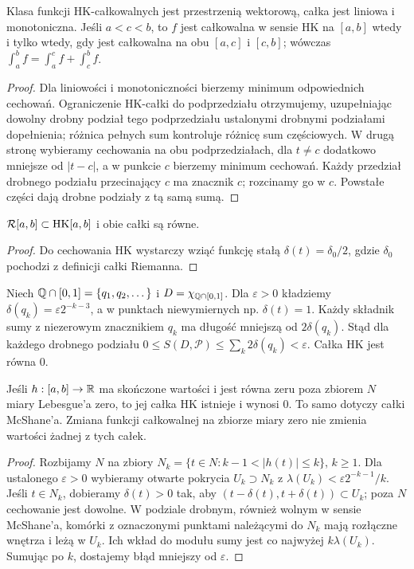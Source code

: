 \begin{twierdzenie}
Klasa funkcji HK-całkowalnych jest przestrzenią wektorową, całka jest liniowa i monotoniczna. Jeśli $a<c<b$, to $f$ jest całkowalna w sensie HK na $[a,b]$ wtedy i tylko wtedy, gdy jest całkowalna na obu $[a,c]$ i $[c,b]$; wówczas $\int_a^b f=\int_a^c f+\int_c^b f$.
\end{twierdzenie}
\begin{proof}
Dla liniowości i monotoniczności bierzemy minimum odpowiednich cechowań. Ograniczenie HK-całki do podprzedziału otrzymujemy, uzupełniając dowolny drobny podział tego podprzedziału ustalonymi drobnymi podziałami dopełnienia; różnica pełnych sum kontroluje różnicę sum częściowych. W drugą stronę wybieramy cechowania na obu podprzedziałach, dla $t\ne c$ dodatkowo mniejsze od $|t-c|$, a w punkcie $c$ bierzemy minimum cechowań. Każdy przedział drobnego podziału przecinający $c$ ma znacznik $c$; rozcinamy go w $c$. Powstałe części dają drobne podziały z tą samą sumą.
\end{proof}
\begin{stwierdzenie}
$\mathcal R[a,b]\subset\mathrm{HK}[a,b]$ i obie całki są równe.
\end{stwierdzenie}
\begin{proof}
Do cechowania HK wystarczy wziąć funkcję stałą $\delta(t)=\delta_0/2$, gdzie $\delta_0$ pochodzi z definicji całki Riemanna.
\end{proof}
\begin{przyklad}
Niech $\mathbb Q\cap[0,1]=\{q_1,q_2,\dots\}$ i $D=\chi_{\mathbb Q\cap[0,1]}$. Dla $\varepsilon>0$ kładziemy $\delta(q_k)=\varepsilon 2^{-k-3}$, a w punktach niewymiernych np. $\delta(t)=1$. Każdy składnik sumy z niezerowym znacznikiem $q_k$ ma długość mniejszą od $2\delta(q_k)$. Stąd dla każdego drobnego podziału $0\le S(D,\mathcal P)\le\sum_k 2\delta(q_k)<\varepsilon$. Całka HK jest równa $0$.
\end{przyklad}
\begin{lemat}
Jeśli $h:[a,b]\to\mathbb R$ ma skończone wartości i jest równa zeru poza zbiorem $N$ miary Lebesgue'a zero, to jej całka HK istnieje i wynosi $0$. To samo dotyczy całki McShane'a. Zmiana funkcji całkowalnej na zbiorze miary zero nie zmienia wartości żadnej z tych całek.
\end{lemat}
\begin{proof}
Rozbijamy $N$ na zbiory $N_k=\{t\in N:k-1<|h(t)|\le k\}$, $k\ge1$. Dla ustalonego $\varepsilon>0$ wybieramy otwarte pokrycia $U_k\supset N_k$ z $\lambda(U_k)<\varepsilon2^{-k-1}/k$. Jeśli $t\in N_k$, dobieramy $\delta(t)>0$ tak, aby $(t-\delta(t),t+\delta(t))\subset U_k$; poza $N$ cechowanie jest dowolne. W podziale drobnym, również wolnym w sensie McShane'a, komórki z oznaczonymi punktami należącymi do $N_k$ mają rozłączne wnętrza i leżą w $U_k$. Ich wkład do modułu sumy jest co najwyżej $k\lambda(U_k)$. Sumując po $k$, dostajemy błąd mniejszy od $\varepsilon$.
\end{proof}
